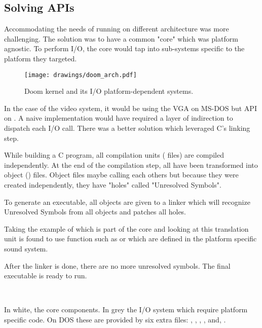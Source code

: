 \subsection{Solving APIs}
Accommodating the needs of running on different architecture was more challenging. The solution was to have a common "core" which was platform agnostic. To perform I/O, the core would tap into sub-systems specific to the platform they targeted.\\
\par
\begin{figure}[H]
\centering
\texttt{[image: drawings/doom\_arch.pdf]}
\caption{Doom kernel and its I/O platform-dependent systems.}
\end{figure}
\par
In the case of the video system, it would be using the VGA on MS-DOS but  API on \NeXT. A naive implementation would have required a layer of indirection to dispatch each I/O call. There was a better solution which leveraged C's linking step.\\
\par
 While building a C program, all compilation units ( files) are compiled independently. At the end of the compilation step, all  have been transformed into object () files. Object files maybe calling each others but because they were created independently, they have "holes" called "Unresolved Symbols".\\
\par
 To generate an executable, all objects are given to a linker which will recognize Unresolved Symbols from all objects and patches all holes.\\
 \par
 Taking the example of  which is part of the core and looking at  this translation unit is found to use function such as  or  which are defined in the platform specific sound system. \\
\par
{}
\par
After the linker is done, there are no more unresolved symbols. The final executable is ready to run.\\
\par
{}\\




\pagebreak
{}
\par
In white, the core components. In grey the I/O system which require platform specific code. On DOS these are provided by six extra files: , , , ,  and, .\\







